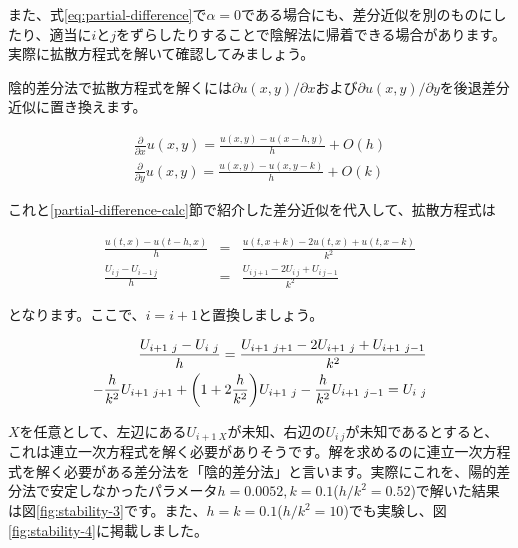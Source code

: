 また、式\ref{eq:partial-difference}で$\alpha=0$である場合にも、差分近似を別のものにしたり、適当に$i$と$j$をずらしたりすることで陰解法に帰着できる場合があります。実際に拡散方程式を解いて確認してみましょう。

陰的差分法で拡散方程式を解くには$\partial u(x,y)/\partial x$および$\partial u(x,y)/\partial y$を後退差分近似に置き換えます。

\begin{eqnarray}
    \frac{\partial}{\partial x}u(x,y)=\frac{u(x,y)-u(x-h,y)}{h}+O(h) \\
    \frac{\partial}{\partial y}u(x,y)=\frac{u(x,y)-u(x,y-k)}{h}+O(k)
\end{eqnarray}

これと\ref{partial-difference-calc}節で紹介した差分近似を代入して、拡散方程式は

\begin{eqnarray}
    \frac{u(t,x)-u(t-h,x)}{h}&=&\frac{u(t,x+k)-2u(t,x)+u(t,x-k)}{k^2} \\
    \frac{U_{i\ j}-U_{i-1\ j}}{h}&=&\frac{U_{i\ j+1}-2U_{i\ j}+U_{i\ j-1}}{k^2}
\end{eqnarray}

\noindent
となります。ここで、$i=i+1$と置換しましょう。

\begin{eqnarray}
    \frac{U_{i+1\ j}-U_{i\ j}}{h}=\frac{U_{i+1\ j+1}-2U_{i+1\ j}+U_{i+1\ j-1}}{k^2} \\
    -\frac{h}{k^2}U_{i+1\ j+1}+\pqty{1+2\frac{h}{k^2}}U_{i+1\ j}-\frac{h}{k^2}U_{i+1\ j-1}=U_{i\ j}
    \label{eq:implicit-diffusion}
\end{eqnarray}

$X$を任意として、左辺にある$U_{i+1\ X}$が未知、右辺の$U_{i\ j}$が未知であるとすると、これは連立一次方程式を解く必要がありそうです。解を求めるのに連立一次方程式を解く必要がある差分法を「陰的差分法」と言います。実際にこれを、陽的差分法で安定しなかったパラメータ$h=0.0052,k=0.1$($h/k^2=0.52$)で解いた結果は図\ref{fig:stability-3}です。また、$h=k=0.1$($h/k^2=10$)でも実験し、図\ref{fig:stability-4}に掲載しました。

